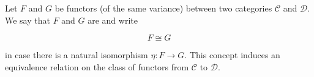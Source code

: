 Let $F$ and $G$ be functors (of the same variance) between two categories $\mathcal{C}$ and $\mathcal{D}$. We say that $F$ and $G$ are  and write

$$F \cong G$$

in case there is a natural isomorphism $\eta: F \to G$. This concept induces an equivalence relation on the class of functors from $\mathcal{C}$ to $\mathcal{D}$.
